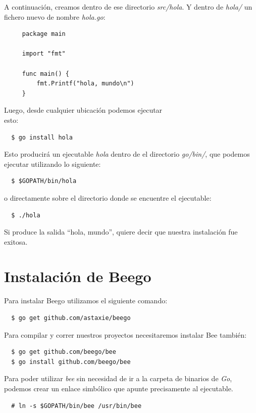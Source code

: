\documentclass[12pt]{article}
\begin{document}
A continuación, creamos dentro de ese directorio  \textit{src/hola}.
Y dentro de \textit{hola/} un fichero nuevo de nombre \textit{hola.go}:
\begin{verbatim}
     package main

     import "fmt"

     func main() {
         fmt.Printf("hola, mundo\n")
     }
\end{verbatim}

Luego, desde cualquier ubicación podemos ejecutar\\
esto:
\begin{verbatim}
  $ go install hola
\end{verbatim}

Esto producirá un ejecutable \textit{hola} dentro de el directorio \textit{go/bin/},
que podemos ejecutar utilizando lo siguiente:
\begin{verbatim}
  $ $GOPATH/bin/hola
\end{verbatim}

o directamente sobre el directorio donde se encuentre el ejecutable:

\begin{verbatim}
  $ ./hola
\end{verbatim}

Si produce la salida ``hola, mundo'', quiere decir que nuestra instalación fue exitosa. \newpage


\section{Instalación de Beego}

\noindent Para instalar Beego utilizamos el siguiente comando:
\begin{verbatim}
  $ go get github.com/astaxie/beego
\end{verbatim}

\noindent Para compilar y correr nuestros proyectos necesitaremos instalar Bee también:
\begin{verbatim}
  $ go get github.com/beego/bee
  $ go install github.com/beego/bee
\end{verbatim}

Para poder utilizar \textit{bee} sin necesidad de ir a la carpeta de binarios de \textit{Go}, podemos crear un enlace simbólico que apunte precisamente al ejecutable.
\begin{verbatim}
  # ln -s $GOPATH/bin/bee /usr/bin/bee 
\end{verbatim}
\end{document}
